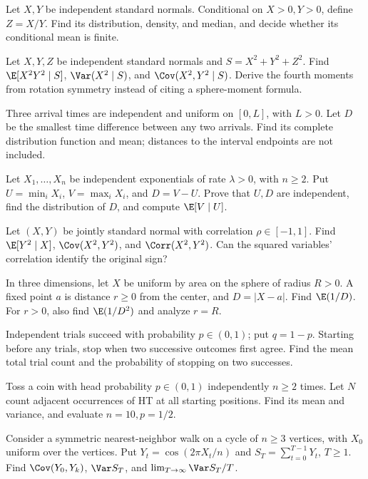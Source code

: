 Let $X,Y$ be independent standard normals. Conditional on $X>0,Y>0$, define $Z=X/Y$. Find its distribution, density, and median, and decide whether its conditional mean is finite.

Let $X,Y,Z$ be independent standard normals and $S=X^2+Y^2+Z^2$. Find $\E[X^2Y^2\mid S]$, $\Var(X^2\mid S)$, and $\Cov(X^2,Y^2\mid S)$. Derive the fourth moments from rotation symmetry instead of citing a sphere-moment formula.

Three arrival times are independent and uniform on $[0,L]$, with $L>0$. Let $D$ be the smallest time difference between any two arrivals. Find its complete distribution function and mean; distances to the interval endpoints are not included.

Let $X_1,\ldots,X_n$ be independent exponentials of rate $\lambda>0$, with $n\ge2$. Put $U=\min_iX_i$, $V=\max_iX_i$, and $D=V-U$. Prove that $U,D$ are independent, find the distribution of $D$, and compute $\E[V\mid U]$.

Let $(X,Y)$ be jointly standard normal with correlation $\rho\in[-1,1]$. Find $\E[Y^2\mid X]$, $\Cov(X^2,Y^2)$, and $\Corr(X^2,Y^2)$. Can the squared variables' correlation identify the original sign?

In three dimensions, let $X$ be uniform by area on the sphere of radius $R>0$. A fixed point $a$ is distance $r\ge0$ from the center, and $D=|X-a|$. Find $\E(1/D)$. For $r>0$, also find $\E(1/D^2)$ and analyze $r=R$.

Independent trials succeed with probability $p\in(0,1)$; put $q=1-p$. Starting before any trials, stop when two successive outcomes first agree. Find the mean total trial count and the probability of stopping on two successes.

Toss a coin with head probability $p\in(0,1)$ independently $n\ge2$ times. Let $N$ count adjacent occurrences of HT at all starting positions. Find its mean and variance, and evaluate $n=10,p=1/2$.

Consider a symmetric nearest-neighbor walk on a cycle of $n\ge3$ vertices, with $X_0$ uniform over the vertices. Put $Y_t=\cos(2\pi X_t/n)$ and $S_T=\sum_{t=0}^{T-1}Y_t$, $T\ge1$. Find $\Cov(Y_0,Y_k)$, $\Var S_T$, and $\lim_{T\to\infty}\Var S_T/T$.

